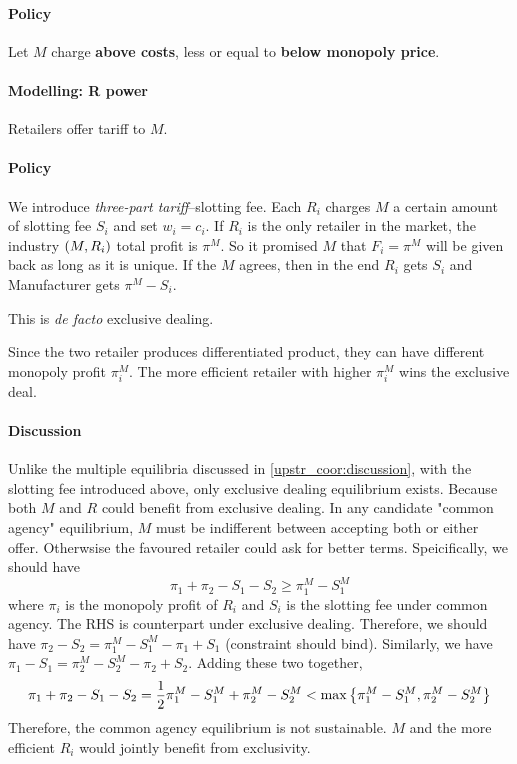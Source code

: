 \paragraph{Policy} Let $M$ charge \textbf{above costs}, less or equal to \textbf{below monopoly price}.

\paragraph{Modelling: R power}
Retailers offer tariff to $M$. 
\paragraph{Policy} We introduce \textit{three-part tariff}--slotting fee. Each $R_i$ charges $M$ a certain amount of slotting fee $S_i$ and set $w_i=c_i$. If $R_i$ is the only retailer in the market, the industry $\left(M,R_i\right)$ total profit is $\pi^M$. So it promised $M$ that $F_i=\pi^M$ will be given back as long as it is unique. If the $M$ agrees, then in the end $R_i$ gets $S_i$ and Manufacturer gets $\pi^M-S_i$.
\begin{remark}
    This is \emph{de facto} exclusive dealing.
\end{remark}
Since the two retailer produces differentiated product, they can have different monopoly profit $\pi_i^M$. The more efficient retailer with higher $\pi_i^M$ wins the exclusive deal. 
\paragraph{Discussion}
Unlike the multiple equilibria discussed in \ref{upstr_coor:discussion}, with the slotting fee introduced above, only exclusive dealing equilibrium exists. Because both $M$ and $R$ could benefit from exclusive dealing.
In any candidate "common agency" equilibrium, $M$ must be indifferent between accepting both or either offer. Otherwsise the favoured retailer could ask for better terms. Speicifically, we should have
\begin{equation*}
    \pi_1+\pi_2-S_1-S_2\geq \pi_1^M-S_1^M
\end{equation*} where $\pi_i$ is the monopoly profit of $R_i$ and $S_i$ is the slotting fee under common agency. The RHS is counterpart under exclusive dealing.
Therefore, we should have $\pi_2-S_2 =\pi_1^M-S_1^M-\pi_1+S_1$ (constraint should bind). Similarly, we have $\pi_1-S_1 =\pi_2^M-S_2^M-\pi_2+S_2$. Adding these two together, \begin{equation*}
    \pi_1+\pi_2-S_1-S_2=\frac{1}{2}\pi_1^M-S_1^M+\pi_2^M-S_2^M<\max\left\{\pi_1^M-S_1^M,\pi_2^M-S_2^M\right\}
\end{equation*}
Therefore, the common agency equilibrium is not sustainable. $M$ and the more efficient $R_i$ would jointly benefit from exclusivity.

